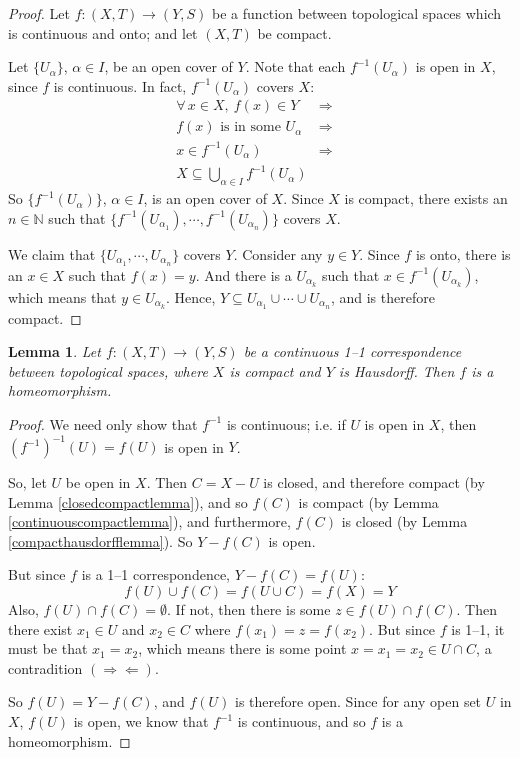 \documentclass[12pt]{report}
\newcommand{\fall}{\forall\,}
\newcommand{\contra}{$(\Rightarrow\Leftarrow)$}
\newcommand{\unionover}[2]{\bigcup_{#1 \in #2 }}
\newcommand{\naturals}{\mathbb{N}}
\newtheorem{lemma}[theorem]{Lemma}
\begin{document}
\begin{proof}
Let $f:(X,T)\rightarrow (Y,S)$ be a function between topological spaces which
is continuous and onto; and let $(X,T)$ be compact.

Let $\{U_\alpha\}$, $\alpha \in I$, be an open cover of $Y$. Note 
that each $f^{-1}(U_\alpha)$ is
open in $X$, since $f$ is continuous.  In fact, $f^{-1}(U_\alpha)$ covers $X$:
\begin{eqnarray*}
\fall x \in X,\ f(x) \in Y & \Rightarrow & \\
f(x) \textrm{ is in some } U_\alpha & \Rightarrow & \\
x \in f^{-1}(U_\alpha)& \Rightarrow & \\
X \subseteq \unionover{\alpha}{I} f^{-1}(U_\alpha) 
\end{eqnarray*}
So $\{f^{-1}(U_\alpha)\}$, $\alpha \in I$, is an open cover of $X$. Since $X$
is compact, there exists an $n \in \naturals$ such that $\{f^{-1}(U_{\alpha_1}),
\cdots, f^{-1}(U_{\alpha_n})\}$ covers $X$.

We claim that $\{U_{\alpha_1}, \cdots, U_{\alpha_n}\}$ covers $Y$. Consider
any $y \in Y$. Since $f$ is onto, there is an $x \in X$ such that $f(x) = y$.
And there is a $U_{\alpha_k}$ such that $x \in f^{-1}(U_{\alpha_k})$, which
means that $y \in U_{\alpha_k}$.  Hence, $Y \subseteq U_{\alpha_1} \cup \cdots
\cup U_{\alpha_n}$, and is therefore compact.
\end{proof}

\begin{lemma} 
\label{compacthausdorffhomeomorphismlemma}
Let $f:(X,T) \rightarrow (Y,S)$ be a continuous 1--1
correspondence between topological spaces, where $X$ is compact and $Y$ is
Hausdorff. Then $f$ is a homeomorphism.
\end{lemma}

\begin{proof}
We need only show that $f^{-1}$ is continuous; i.e. if $U$ is open in $X$,
then $(f^{-1})^{-1}(U) = f(U)$ is open in $Y$.

So, let $U$ be open in $X$. Then $C = X - U$ is closed, and therefore compact
(by Lemma \ref{closedcompactlemma}), and so $f(C)$ is compact (by Lemma
\ref{continuouscompactlemma}), and furthermore, $f(C)$ is closed (by Lemma 
\ref{compacthausdorfflemma}). So $Y - f(C)$ is open.

But since $f$ is a 1--1 correspondence, $Y-f(C) = f(U)$: 
\begin{displaymath}
f(U) \cup f(C) = f(U \cup C) = f(X) = Y
\end{displaymath}
Also, $f(U) \cap f(C) = \emptyset$. If not, then there is some $z \in f(U)
\cap f(C)$. Then there exist $x_1 \in U$ and $x_2 \in C$ where $f(x_1) = z =
f(x_2)$. But since $f$ is 1--1, it must be that $x_1 = x_2$, which means there
is some point $x = x_1 = x_2 \in U \cap C$, a contradition \contra. 

So $f(U) = Y - f(C)$, and $f(U)$ is therefore open. Since for any open set $U$
in $X$, $f(U)$ is open, we know that $f^{-1}$ is continuous, and so $f$ is a
homeomorphism.
\end{proof}
\end{document}
